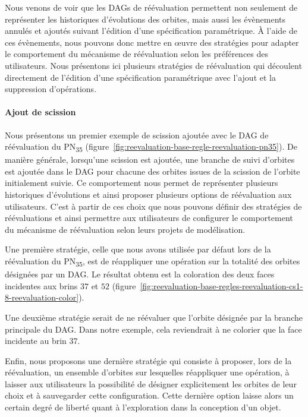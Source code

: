 Nous venons de voir que les DAGs de réévaluation permettent non seulement de représenter les historiques
d'évolutions des orbites, mais aussi les évènements
annulés et ajoutés suivant l'édition d'une spécification paramétrique. %
À l'aide de ces évènements, nous pouvons donc mettre en \oe uvre des stratégies pour
adapter le comportement du mécanisme de réévaluation selon les préférences des
utilisateurs. %
Nous présentons ici plusieurs stratégies de réévaluation qui découlent
directement de l'édition d'une spécification paramétrique avec l'ajout et la
suppression d'opérations. %

\paragraph*{Ajout de scission}

Nous présentons un premier exemple de scission ajoutée avec le DAG de
réévaluation du PN\textsubscript{35}
(figure~\ref{fig:reevaluation-base-regle-reevaluation-pn35}). %
De manière générale, lorsqu'une scission est ajoutée, une branche de suivi
d'orbites est ajoutée dans le DAG pour chacune des orbites issues de la scission
de l'orbite initialement suivie. %
Ce comportement nous permet de représenter plusieurs historiques d'évolutions et
ainsi proposer plusieurs options de réévaluation aux utilisateurs. %
C'est à partir de ces choix que nous pouvons définir des stratégies de
réévaluations et ainsi permettre aux utilisateurs de configurer le comportement
du mécanisme de réévaluation selon leurs projets de modélisation. %

Une première stratégie, celle que nous avons utilisée par défaut lors de la
réévaluation du PN\textsubscript{35}, est de réappliquer une opération sur la
totalité des orbites désignées par un DAG. %
Le résultat obtenu est la coloration des deux faces incidentes aux brins \(37\)
et \(52\)
(figure~\ref{fig:reevaluation-base-regles-reevaluation-cs1-8-reevaluation-color}). %

Une deuxième stratégie serait de ne réévaluer que l'orbite désignée par la
branche principale du DAG. %
Dans notre exemple, cela reviendrait à ne colorier que la face incidente au brin
\(37\). %

Enfin, nous proposons une dernière stratégie qui consiste à proposer, lors de la
réévaluation, un ensemble d'orbites sur lesquelles réappliquer une opération, à laisser aux utilisateurs la possibilité de désigner explicitement les
orbites de leur choix et à sauvegarder cette configuration. %
Cette dernière option laisse alors un certain degré de liberté quant à
l'exploration dans la conception d'un objet. %

